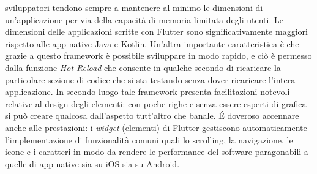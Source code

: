 	sviluppatori tendono sempre a mantenere al minimo le dimensioni di
	un’applicazione per via della capacità di memoria limitata degli utenti. Le dimensioni
	delle applicazioni scritte con Flutter sono significativamente maggiori rispetto alle app native Java e
	Kotlin.
	Un'altra importante caratteristica è che
	grazie a questo framework è possibile sviluppare in modo rapido, e ciò è permesso dalla
	funzione \textit{Hot Reload} che consente in qualche secondo di ricaricare
	la particolare sezione di codice che si sta testando senza dover ricaricare
	l'intera applicazione. In secondo luogo tale framework presenta
	facilitazioni notevoli relative al design degli elementi: con poche righe e
	senza essere esperti di grafica si può creare qualcosa dall'aspetto tutt'altro che
	banale. \'E doveroso accennare anche alle prestazioni: i \textit{widget}
	(elementi) di Flutter gestiscono automaticamente l'implementazione di
	funzionalità comuni quali lo scrolling, la navigazione, le icone e i
	caratteri in
	modo da rendere le performance del software paragonabili a quelle di app
	native sia su iOS sia su Android. 

